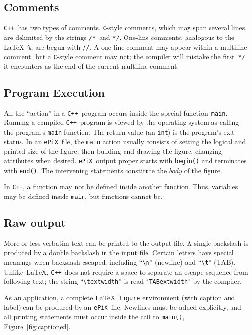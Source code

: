 \documentclass[12pt]{report}
\newcommand{\code}[1]{\texttt{#1}}
\newcommand{\ePiX}{\code{ePiX}}
\newcommand{\CXX}{\code{C++}}
\begin{document}
\subsection*{Comments}

\CXX\ has two types of comments. \code{C}-style comments, which may
span several lines, are delimited by the strings \code{/*}~and
\code{*/}. One-line comments, analogous to the \LaTeX~\code{\%}, are
begun with \code{//}. A one-line comment may appear within a multiline
comment, but a \code{C}-style comment may not; the compiler will
mistake the first~\code{*/} it encounters as the end of the current
multiline comment.


\subsection*{Program Execution}

All the ``action'' in a \CXX\ program occurs inside the special
function~\code{main}. Running a compiled \CXX~program is viewed by the
operating system as calling the program's \code{main} function. The
return value (an \code{int}) is the program's exit status.  In an
\ePiX\ file, the \code{main} action usually consists of setting the
logical and printed size of the figure, then building and drawing the
figure, changing attributes when desired.  \ePiX\ output proper starts
with \code{begin()} and terminates with \code{end()}. The intervening
statements constitute the \emph{body} of the figure.

In \CXX, a function may not be defined inside another function. Thus,
variables may be defined inside \code{main}, but functions cannot be.


\subsection*{Raw output} 

More-or-less verbatim text can be printed to the output file.  A
single backslash is produced by a double backslash in the input file.
Certain letters have special meanings when backslash-escaped,
including ``\verb+\n+'' (newline) and ``\verb+\t+'' (TAB).
Unlike~\LaTeX, \CXX~does not require a space to separate an escape
sequence from following text; the string ``\verb+\textwidth+'' is read
``\code{TABextwidth}'' by the compiler.

As an application, a complete \LaTeX\ \code{figure} environment (with
caption and label) can be produced by an \ePiX\ file. Newlines must be
added explicitly, and all printing statements must occur inside the
call to \code{main()}, Figure~\ref{fig:captioned}.
\end{document}
